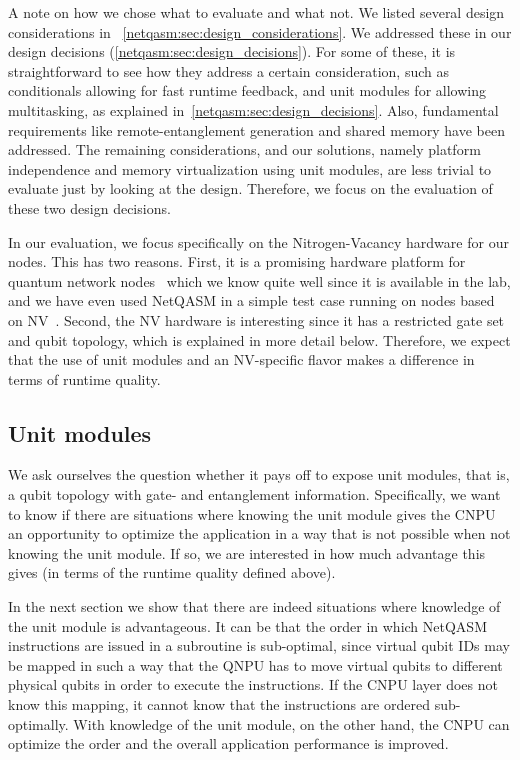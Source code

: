 A note on how we chose what to evaluate and what not.
We listed several design considerations in ~\cref{netqasm:sec:design_considerations}.
We addressed these in our design decisions (\cref{netqasm:sec:design_decisions}).
For some of these, it is straightforward to see how they address a certain consideration, such as conditionals allowing for fast runtime feedback, and unit modules for allowing multitasking, as explained in~\cref{netqasm:sec:design_decisions}.
Also, fundamental requirements like remote-entanglement generation and shared memory have been addressed.
The remaining considerations, and our solutions, namely platform independence and memory virtualization using unit modules, are less trivial to evaluate just by looking at the design.
Therefore, we focus on the evaluation of these two design decisions.

In our evaluation, we focus specifically on the Nitrogen-Vacancy hardware for our nodes.
This has two reasons.
First, it is a promising hardware platform for quantum network nodes~\cite{Taminiau2014} which we know quite well since it is available in the lab, and we have even used \ac{NetQASM} in a simple test case running on nodes based on NV~\cite{pompili2021experimental}.
Second, the NV hardware is interesting since it has a restricted gate set and qubit topology, which is explained in more detail below.
Therefore, we expect that the use of unit modules and an NV-specific flavor makes a difference in terms of runtime quality.

\subsection{Unit modules}
\label{netqasm:sec:evaluation-unit-modules}
We ask ourselves the question whether it pays off to expose unit modules, that is, a qubit topology with gate- and entanglement information.
Specifically, we want to know if there are situations where knowing the unit module gives the \ac{CNPU} an opportunity to optimize the application in a way that is not possible when not knowing the unit module.
If so, we are interested in how much advantage this gives (in terms of the runtime quality defined above).

In the next section we show that there are indeed situations where knowledge of the unit module is advantageous.
It can be that the order in which \ac{NetQASM} instructions are issued in a subroutine is sub-optimal, since virtual qubit IDs may be mapped in such a way that the \ac{QNPU} has to move virtual qubits to different physical qubits in order to execute the instructions.
If the \ac{CNPU} layer does not know this mapping, it cannot know that the instructions are ordered sub-optimally.
With knowledge of the unit module, on the other hand, the \ac{CNPU} can optimize the order and the overall application performance is improved.

